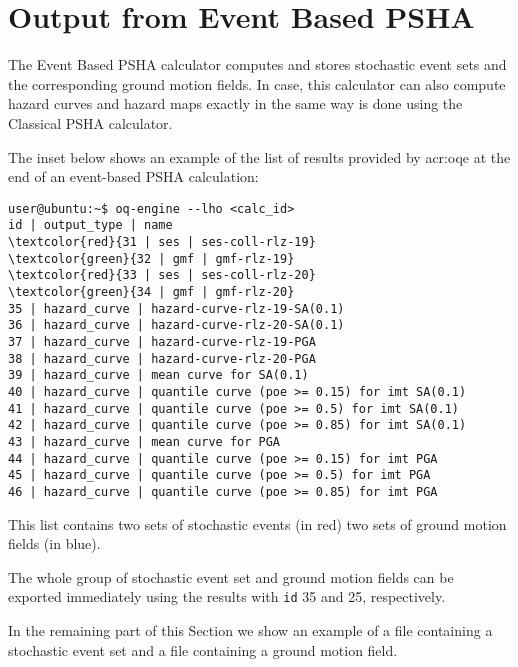 \section{Output from Event Based PSHA}\label{EventBasedOutput}
%
The Event Based PSHA calculator computes and stores stochastic 
event sets and the corresponding ground motion fields. In case,
this calculator can also compute hazard curves and hazard maps
exactly in the same way is done using the Classical PSHA calculator.

The inset below shows an example of the list of results provided by 
\gls{acr:oqe} at the end of an event-based PSHA calculation:
%
\begin{Verbatim}[frame=single, commandchars=\\\{\}, fontsize=\small]
user@ubuntu:~$ oq-engine --lho <calc_id> 
id | output_type | name
\textcolor{red}{31 | ses | ses-coll-rlz-19}
\textcolor{green}{32 | gmf | gmf-rlz-19}
\textcolor{red}{33 | ses | ses-coll-rlz-20}
\textcolor{green}{34 | gmf | gmf-rlz-20}
35 | hazard_curve | hazard-curve-rlz-19-SA(0.1)
36 | hazard_curve | hazard-curve-rlz-20-SA(0.1)
37 | hazard_curve | hazard-curve-rlz-19-PGA
38 | hazard_curve | hazard-curve-rlz-20-PGA
39 | hazard_curve | mean curve for SA(0.1)
40 | hazard_curve | quantile curve (poe >= 0.15) for imt SA(0.1)
41 | hazard_curve | quantile curve (poe >= 0.5) for imt SA(0.1)
42 | hazard_curve | quantile curve (poe >= 0.85) for imt SA(0.1)
43 | hazard_curve | mean curve for PGA
44 | hazard_curve | quantile curve (poe >= 0.15) for imt PGA
45 | hazard_curve | quantile curve (poe >= 0.5) for imt PGA
46 | hazard_curve | quantile curve (poe >= 0.85) for imt PGA
\end{Verbatim}
This list contains two sets of stochastic events (in red) two sets of ground motion fields (in blue).

The whole group of stochastic event set and ground motion fields can 
be exported immediately using the results with \texttt{id} 35 and 25,
respectively.

In the remaining part of this Section we show an example of a file
containing a stochastic event set and a file containing a ground 
motion field.

